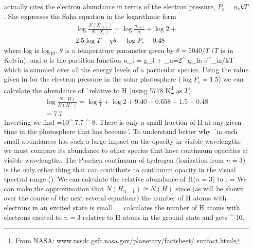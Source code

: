 \cite{boehm1989} actually cites the electron abundance in terms of the electron
pressure, $P_e=n_e kT$. She
expresses the Saha equation in the logarithmic form
\begin{multline}
\log \frac{N(X_{i+1})}{N(X_i)} = \log \frac{u_{i+1}}{u_i}+\log 2 +\\
 2.5 \log T - \chi \theta - \log P_e - 0.48
\end{multline}
where log is log$_{10}$, $\theta$ is a temperature parameter given by
$\theta = 5040/T$ ($T$ is in Kelvin), and $u$ is the partition function
\beq
u_i = g_i + \sum\limits_{n=2}^{\infty} g_{in} e^{\chi_{in}/kT}
\eeq
which is summed over all the energy levels of a particular species.
Using the value given in \cite{boehm1989} for the electron pressure in
the solar photosphere 
($\log P_e = 1.5$) we can calculate the abundance of \h\ relative to H
(using 5778 K\footnote{From NASA: www.nssdc.gsfc.nasa.gov/planetary/factsheet/ sunfact.html} as $T$)
\begin{multline}
\log \frac{N(H)}{N(H^-)} = \log \frac{4}{1} + \log 2 + 9.40 - 0.658  -
1.5 - 0.48\\ = 7.7
\end{multline}
Inverting we find 
\beq
\label{eq:hminusab}
=10^{-7.7}  ^{-8}.
\eeq
There is only a small fraction of H at any given time in the
photosphere that has become \h.  To understand better why \h\ in such
small abundances has such a large impact on the opacity in visible
wavelengths we must compare its abundance to other species that have
continuum opacities at visible wavelengths.  The Paschen continuum of
hydrogen (ionization from $n=3$) is the only other thing that can contribute
to continuum opacity in the visual spectral range
(\citealt{boehm1989}).  
We can calculate the relative abundance of H($n=3$) to \h.
\beq
  = 
\eeq
We can make the approximation that $N(H_{n=1})\approxeq N(H)$ since (as will be shown over the course of the next several equations) the number of H atoms with electrons in an excited state is small.
\beq
  = 
\eeq
\cite{boehm1989} calculates the number of H atoms with electrons excited to $n=3$ relative to H atoms in the ground state and gets
\beq
{}   ^{-10}.

